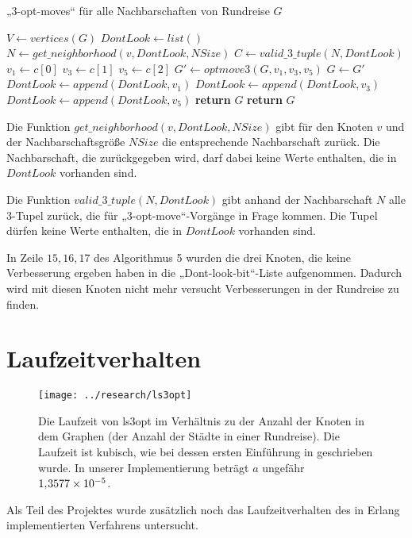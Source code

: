 \begin{algorithm}
  \caption{„3-opt-moves“ für alle Nachbarschaften von Rundreise $G$}\label{alg:ls3opt_run}
\begin{algorithmic}[1]
   
    \State $V \gets vertices(G)$
    \State $DontLook \gets list()$
      \State $N \gets get\_neighborhood(v, DontLook, NSize)$
      \State $C \gets valid\_3\_tuple(N, DontLook)$
        \State $v_1 \gets c[0]$
        \State $v_3 \gets c[1]$
        \State $v_5 \gets c[2]$
        \State $G' \gets optmove3(G, v_1,v_3,v_5)$
          \State $G \gets G'$ 
        \Else
          \State $DontLook \gets append(DontLook, v_1)$ 
          \State $DontLook \gets append(DontLook, v_3)$
          \State $DontLook \gets append(DontLook, v_5)$
        \EndIf
      \EndForeach
        \State \textbf{return} $G$ 
      \EndIf
    \EndForeach
    \State \textbf{return} $G$
  \EndProcedure
\end{algorithmic}
\end{algorithm}

\begin{bem}
  Die Funktion $get\_neighborhood(v, DontLook, NSize)$ gibt für den
  Knoten $v$ und der Nachbarschaftsgröße $NSize$ die entsprechende
  Nachbarschaft zurück. Die Nachbarschaft, die zurückgegeben wird, darf
  dabei keine Werte enthalten, die in $DontLook$ vorhanden sind.
\end{bem}

\begin{bem}
Die Funktion $valid\_3\_tuple(N, DontLook)$ gibt anhand der
  Nachbarschaft $N$ alle 3-Tupel zurück, die für „3-opt-move“-Vorgänge
  in Frage kommen. Die Tupel dürfen keine Werte enthalten, die in
  $DontLook$ vorhanden sind.
\end{bem}
In Zeile $15,16,17$ des Algorithmus 5 wurden die drei Knoten, die keine
Verbesserung ergeben haben in die „Dont-look-bit“-Liste aufgenommen.
Dadurch wird mit diesen Knoten nicht mehr versucht Verbesserungen in der
Rundreise zu finden. 
\section{Laufzeitverhalten}
\begin{figure}[ht]
  \centering
  \texttt{[image: ../research/ls3opt]}
  \caption[Laufzeit von ls3opt im Verhältnis zu der Anzahl der
  Knoten]{\label{fig:ls3optcomplxty} Die Laufzeit von ls3opt im
    Verhältnis zu der Anzahl der Knoten in dem Graphen (der Anzahl der
    Städte in einer Rundreise).  Die Laufzeit ist kubisch, wie bei
    dessen ersten Einführung in \cite{lin1965computer} geschrieben
    wurde.  In unserer Implementierung beträgt $a$ ungefähr
    $1,\kern-1pt 3577 \times 10^{-5}$.} %
\end{figure}

Als Teil des Projektes wurde zusätzlich noch das Laufzeitverhalten des
in Erlang implementierten Verfahrens untersucht. 
